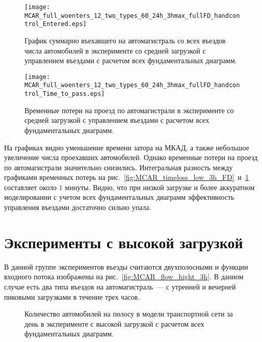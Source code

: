 \begin{figure}[ht]
    \begin{minipage}[b][][b]{0.49\textwidth}
        \centering
        \texttt{[image: MCAR\_full\_woenters\_12\_two\_types\_60\_24h\_3hmax\_fullFD\_handcontrol\_Entered.eps]}
        \caption{График суммарно въехавшего на автомагистраль со всех въездов числа автомобилей в эксперименте со средней загрузкой с управлением въездами с расчетом всех фундаментальных диаграмм.}
        \label{fig:MCAR_entered_low_3h_handcontrol_FD}
    \end{minipage}
    \hfill
    \begin{minipage}[b][][b]{0.49\textwidth}
        \centering
        \texttt{[image: MCAR\_full\_woenters\_12\_two\_types\_60\_24h\_3hmax\_fullFD\_handcontrol\_Time\_to\_pass.eps]}
        \caption{Временные потери на проезд по автомагистрали в эксперименте со средней загрузкой с управлением въездами с расчетом всех фундаментальных диаграмм.}
        \label{fig:MCAR_timeloss_low_3h_handcontrol_FD}
    \end{minipage}
\end{figure}

На графиках видно уменьшение времени затора на МКАД, а также небольшое увеличение числа проехавших автомобилей.
Однако временные потери на проезд по автомагистрали значительно снизились.
Интегральная разность между графиками временных потерь на рис.~\ref{fig:MCAR_timeloss_low_3h_FD}~и~\ref{fig:MCAR_timeloss_low_3h_handcontrol_FD} составляет около $1$ минуты.
Видно, что при низкой загрузке и более аккуратном моделировании с учетом всех фундаментальных диаграмм эффективность управления въездами достаточно сильно упала.


\section{Эксперименты с высокой загрузкой}
\label{sec:ch6/hight_FD}
В данной группе экспериментов въезды считаются двухполосными и функции входного потока изображены на рис.~\ref{fig:MCAR_flow_hight_3h}.
В данном случае есть два типа въездов на автомагистраль~--- с утренней и вечерней пиковыми загрузками в течение трех часов.

\begin{figure}[ht]
    \caption{Количество автомобилей на полосу в модели транспортной сети за день в эксперименте с высокой загрузкой с расчетом всех фундаментальных диаграмм.}
    \label{fig:MCAR_heatmap_hight_3h_FD}
\end{figure}


